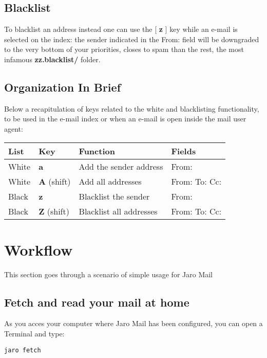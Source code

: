 \documentclass[a4,onecolumn,portrait]{article}
\begin{document}
\subsection{Blacklist}
\label{sec-5-3}

To blacklist an address instead one can use the [ \textbf{z} ] key while an
e-mail is selected on the index: the sender indicated in the From:
field will be downgraded to the very bottom of your priorities, closes
to spam than the rest, the most infamous \textbf{zz.blacklist/} folder.
\subsection{Organization In Brief}
\label{sec-5-4}

Below a recapitulation of keys related to the white and blacklisting
functionality, to be used in the e-mail index or when an e-mail is
open inside the mail user agent:

\begin{center}
\begin{tabular}{llll}
List & Key & Function & Fields\\
\hline
White & \textbf{a} & Add the sender address & From:\\
White & \textbf{A} (shift) & Add all addresses & From: To: Cc:\\
Black & \textbf{z} & Blacklist the sender & From:\\
Black & \textbf{Z} (shift) & Blacklist all addresses & From: To: Cc:\\
\end{tabular}
\end{center}
\section{Workflow}
\label{sec-6}

This section goes through a scenario of simple usage for Jaro Mail

\subsection{Fetch and read your mail at home}
\label{sec-6-1}

As you acces your computer where Jaro Mail has been configured, you can open a Terminal and type:

\begin{verbatim}
jaro fetch
\end{verbatim}
\end{document}
